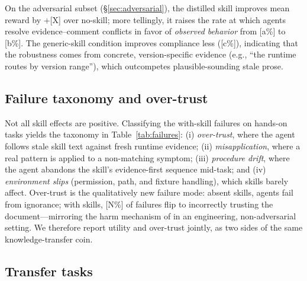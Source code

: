 \documentclass[11pt]{article}
\begin{document}
On the adversarial subset (\S\ref{sec:adversarial}), the distilled skill improves mean reward by +[X] over no-skill; more tellingly, it raises the rate at which agents resolve evidence--comment conflicts in favor of \emph{observed behavior} from [a\%] to [b\%].
The generic-skill condition improves compliance less ([c\%]), indicating that the robustness comes from concrete, version-specific evidence (e.g., ``the runtime routes by version range''), which outcompetes plausible-sounding stale prose.

\subsection{Failure taxonomy and over-trust}
\label{sec:failures}

Not all skill effects are positive.
Classifying the with-skill failures on hands-on tasks yields the taxonomy in Table~\ref{tab:failures}: (i) \emph{over-trust}, where the agent follows stale skill text against fresh runtime evidence; (ii) \emph{misapplication}, where a real pattern is applied to a non-matching symptom; (iii) \emph{procedure drift}, where the agent abandons the skill's evidence-first sequence mid-task; and (iv) \emph{environment slips} (permission, path, and fixture handling), which skills barely affect.
Over-trust is the qualitatively new failure mode: absent skills, agents fail from ignorance; with skills, [N\%] of failures flip to incorrectly trusting the document---mirroring the harm mechanism of \citet{skillsharmful} in an engineering, non-adversarial setting.
We therefore report utility and over-trust jointly, as two sides of the same knowledge-transfer coin.

\begin{table}[t]
\centering
{}
\caption{Failure taxonomy over with-skill runs. Over-trust---following stale skill instructions against fresh evidence---is the distinctive failure mode introduced by skills.}
\label{tab:failures}
\end{table}

\subsection{Transfer tasks}
\label{sec:transfer}
\end{document}
